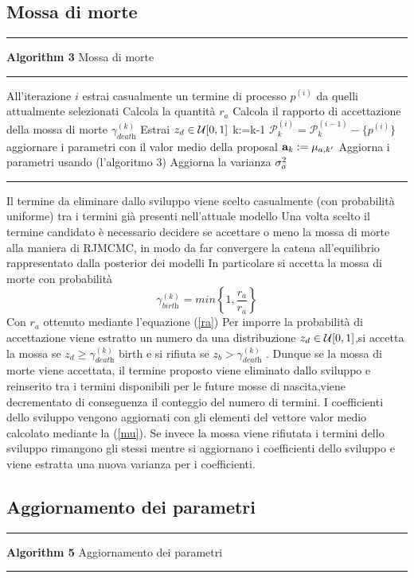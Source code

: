 \subsection{Mossa di morte}
\hrule 
\textbf{Algorithm 3} Mossa di morte
\hrule

\begin{algorithmic}
\State All'iterazione $i$ estrai casualmente un termine di processo $p^{(i)}$ da quelli attualmente  selezionati
\State Calcola la quantità $r_a$
\State Calcola il rapporto di accettazione della mossa di morte $\gamma_{\textit{death}}^{(k)}$
\State Estrai $z_d\in\mathcal{U}[0,1]$
\State k:=k-1
\State $ \mathcal{P}_k^{(i)}= \mathcal{P}_k^{(i-1)}- \{p^{(i)}\} $
\State aggiornare i parametri con il valor medio della proposal $\textbf{a}_k:=\mu_{a,k'}$
\Else
\State Aggiorna i parametri usando (l'algoritmo 3)
\State Aggiorna la varianza $\sigma_a^2$
\EndIf
\end{algorithmic}
\hrule
\vspace{2em}
Il termine da eliminare dallo sviluppo viene scelto casualmente (con probabilità
uniforme) tra i termini già presenti nell’attuale modello
Una volta scelto il termine candidato è necessario decidere se accettare o meno la
mossa di morte alla maniera di RJMCMC, in modo da far convergere la catena
all’equilibrio rappresentato dalla posterior dei modelli
In particolare si accetta la mossa di morte con probabilità
\begin{equation}
\gamma_{\textit{birth}}^{(k)}=min\left\lbrace 1,\frac{r_a}{r_a}\right\rbrace
\end{equation}
Con $r_a$ ottenuto mediante l’equazione (\ref{ra})
Per imporre la probabilità di accettazione viene estratto un numero da una distribuzione
 $z_d\in\mathcal{U}[0,1]$,si accetta la
mossa se $z_d\geq \gamma_{\textit{death}}^{(k)}$ birth e si rifiuta se $z_b> \gamma_{\textit{death}}^{(k)}$ .
Dunque se la mossa di morte viene accettata, il termine proposto viene eliminato
dallo sviluppo e reinserito tra i termini disponibili per le future mosse di nascita,viene
decrementato di conseguenza il conteggio del numero di termini. I coefficienti dello
sviluppo vengono aggiornati con gli elementi del vettore valor medio calcolato mediante la (\ref{mu}).
Se invece la mossa viene rifiutata i termini dello sviluppo rimangono gli stessi mentre
si aggiornano i coefficienti dello sviluppo e viene estratta una nuova varianza per i
coefficienti.
\subsection{Aggiornamento dei parametri}
\hrule 
\textbf{Algorithm 5} Aggiornamento dei parametri
\hrule

